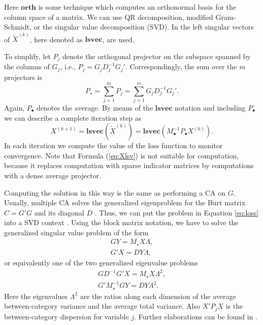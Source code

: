 \documentclass[article]{Z}
\begin{document}
Here $\mathbf{orth}$ is some technique which computes an orthonormal basis for the column space of a matrix. We can use QR decomposition, modified Gram-Schmidt, or the singular value decomposition (SVD). In  the left singular vectors of $\tilde X^{(k)}$, here denoted as $\mathbf{lsvec}$, are used. 

To simplify, let $P_j$ denote the orthogonal projector on the subspace spanned by the columns of $G_j$, i.e.,
$P_j^{}=G_j^{}D_j^{-1}G_j'$. Correspondingly, the sum over the $m$ projectors is 
\begin{equation}
P_\star=\sum_{j=1}^m P_j = \sum_{j=1}^m G_j^{}D_j^{-1}G_j'.
\end{equation}
Again, $P_\bullet$ denotes the average. By means of the $\mathbf{lsvec}$ notation and including $P_\bullet$ we can describe a complete iteration step as 
\begin{equation}
\label{eq:Xlsv}
X^{(k+1)}=\mathbf{lsvec}(\tilde X^{(k)})=\mathbf{lsvec}(M_\bullet^{-1}P_\bullet^{} X^{(k)}).
\end{equation}
In each iteration we compute the value of the loss function to monitor convergence. Note that Formula (\ref{eq:Xlsv}) is not suitable for computation, because it replaces computation with sparse indicator matrices by computations with a dense average projector. 

Computing the  solution in this way is the same as performing a CA on $G$. Usually, multiple CA solves the generalized eigenproblem for the Burt matrix $C=G'G$ and its diagonal \(D\) \citep{Greenacre:84,Greenacre+Blasius:06}.
Thus, we can put the problem in Equation \ref{eq:loss} into a SVD context \citep{deLeeuw+Michailides+Wang:99}. Using the block matrix notation, we have to solve the generalized singular value problem of the form
\begin{eqnarray}
GY=M_\star X\Lambda, \\
G'X=DY\Lambda,
\end{eqnarray}
or equivalently one of the two generalized eigenvalue problems
\begin{eqnarray}
GD^{-1}G'X=M_\star X\Lambda^2, \\
G'M_\star^{-1}GY=DY\Lambda^2.
\end{eqnarray}
Here the eigenvalues $\Lambda^2$ are the ratios along each dimension of the average between-category variance and the average total variance.
Also $X'P_jX$ is the between-category dispersion for variable $j$. Further elaborations can be found in \citet{Michailidis+deLeeuw:98}. 
\end{document}
